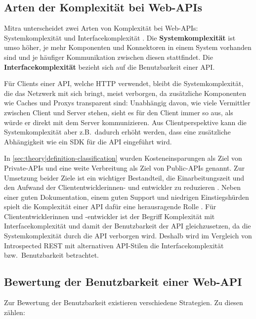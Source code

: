 \subsection{Arten der Komplexität bei Web-APIs}
Mitra unterscheidet zwei Arten von Komplexität bei Web-APIs: Systemkomplexität und Interfacekomplexität \autocite[04:08--04:25]{Mitra2015}. Die \textbf{Systemkomplexität} ist umso höher, je mehr Komponenten und Konnektoren in einem System vorhanden sind und je häufiger Kommunikation zwischen diesen stattfindet. Die \textbf{Interfacekomplexität} bezieht sich auf die Benutzbarkeit einer API\@.

Für Clients einer API, welche HTTP verwendet, bleibt die Systemkomplexität, die das Netzwerk mit sich bringt, meist verborgen, da zusätzliche Komponenten wie Caches und Proxys transparent sind: Unabhängig davon, wie viele Vermittler zwischen Client und Server stehen, sieht es für den Client immer so aus, als würde er direkt mit dem Server kommunizieren. Aus Clientperspektive kann die Systemkomplexität aber z.B.\ dadurch erhöht werden, dass eine zusätzliche Abhängigkeit wie ein SDK für die API eingeführt wird.

In \cref{sec:theory|definition-classification} wurden Kosteneinsparungen als Ziel von Private-APIs und eine weite Verbreitung als Ziel von Public-APIs genannt. Zur Umsetzung beider Ziele ist ein wichtiger Bestandteil, die Einarbeitungszeit und den Aufwand der Cliententwicklerinnen- und entwickler zu reduzieren \autocite{Myers2016}. Neben einer guten Dokumentation, einem guten Support und niedrigen Einstiegshürden spielt die Komplexität einer API dafür eine herausragende Rolle\footnotemark{} \autocite[S.~9]{Lauret2019}. Für Cliententwicklerinnen und -entwickler ist der Begriff Komplexität mit Interfacekomplexität \textendash{} und damit der Benutzbarkeit der API \textendash{} gleichzusetzen, da die Systemkomplexität durch die API verborgen wird. Deshalb wird im Vergleich von Introspected REST mit alternativen API-Stilen die Interfacekomplexität bzw.\ Benutzbarkeit betrachtet.


\subsection{Bewertung der Benutzbarkeit einer Web-API}\label{subsec:comp-criteria|complexity|evaluation}
Zur Bewertung der Benutzbarkeit existieren verschiedene Strategien. Zu diesen zählen:

